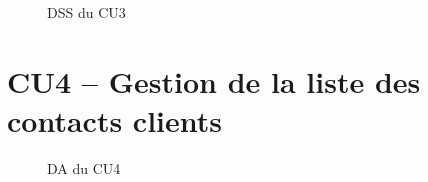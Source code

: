 \begin{figure}[H]
\noindent{}
\caption{DSS du CU3}
\end{figure}

\clearpage
\section{CU4 – Gestion de la liste des contacts clients}

\begin{figure}[H]
\noindent{}
\caption{DA du CU4}
\end{figure}

